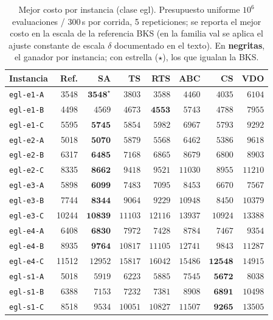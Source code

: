 \begin{table}[htbp]
\centering
\caption{Mejor costo por instancia (clase egl). Presupuesto uniforme $10^6$ evaluaciones / 300\,s por corrida, 5 repeticiones; se reporta el mejor costo en la escala de la referencia BKS (en la familia val se aplica el ajuste constante de escala $\delta$ documentado en el texto). En \textbf{negritas}, el ganador por instancia; con estrella ($\star$), los que igualan la BKS.}
\label{tab:mejores-egl}
\small
\begin{tabular}{lrrrrrrr}
\toprule
Instancia & Ref. & SA & TS & RTS & ABC & CS & VDO \\
\midrule
\texttt{egl-e1-A} & 3548 & $\mathbf{3548}^{\star}$ & $3803$ & $3588$ & $4460$ & $4035$ & $6104$ \\
\texttt{egl-e1-B} & 4498 & $4569$ & $4673$ & $\mathbf{4553}$ & $5743$ & $4788$ & $7955$ \\
\texttt{egl-e1-C} & 5595 & $\mathbf{5745}$ & $5854$ & $5982$ & $6967$ & $5793$ & $9292$ \\
\texttt{egl-e2-A} & 5018 & $\mathbf{5070}$ & $5879$ & $5568$ & $6462$ & $5386$ & $9618$ \\
\texttt{egl-e2-B} & 6317 & $\mathbf{6485}$ & $7168$ & $6865$ & $8679$ & $6800$ & $8903$ \\
\texttt{egl-e2-C} & 8335 & $\mathbf{8662}$ & $9418$ & $9521$ & $11030$ & $8955$ & $11210$ \\
\texttt{egl-e3-A} & 5898 & $\mathbf{6099}$ & $7483$ & $7095$ & $8453$ & $6670$ & $7567$ \\
\texttt{egl-e3-B} & 7744 & $\mathbf{8344}$ & $9064$ & $9229$ & $10948$ & $8450$ & $10379$ \\
\texttt{egl-e3-C} & 10244 & $\mathbf{10839}$ & $11103$ & $12116$ & $13937$ & $10924$ & $13388$ \\
\texttt{egl-e4-A} & 6408 & $\mathbf{6830}$ & $7972$ & $7428$ & $8784$ & $7467$ & $9354$ \\
\texttt{egl-e4-B} & 8935 & $\mathbf{9764}$ & $10817$ & $11105$ & $12741$ & $9843$ & $11287$ \\
\texttt{egl-e4-C} & 11512 & $12952$ & $15817$ & $16042$ & $15486$ & $\mathbf{12548}$ & $14915$ \\
\texttt{egl-s1-A} & 5018 & $5919$ & $6223$ & $5885$ & $7545$ & $\mathbf{5672}$ & $8038$ \\
\texttt{egl-s1-B} & 6388 & $7153$ & $7232$ & $7381$ & $8908$ & $\mathbf{6891}$ & $10498$ \\
\texttt{egl-s1-C} & 8518 & $9534$ & $10051$ & $10827$ & $11507$ & $\mathbf{9265}$ & $13505$ \\

\end{tabular}
\end{table}
